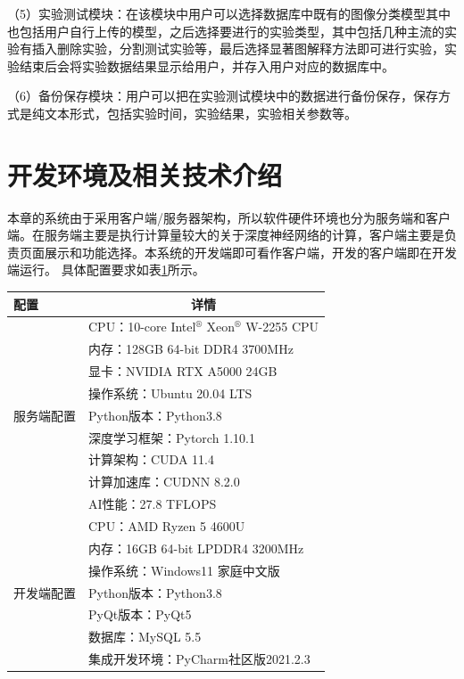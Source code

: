  （5）实验测试模块：在该模块中用户可以选择数据库中既有的图像分类模型其中也包括用户自行上传的模型，之后选择要进行的实验类型，其中包括几种主流的实验有插入删除实验，分割测试实验等，最后选择显著图解释方法即可进行实验，实验结束后会将实验数据结果显示给用户，并存入用户对应的数据库中。
 
 （6）备份保存模块：用户可以把在实验测试模块中的数据进行备份保存，保存方式是纯文本形式，包括实验时间，实验结果，实验相关参数等。


 
\section{开发环境及相关技术介绍}
本章的系统由于采用客户端/服务器架构，所以软件硬件环境也分为服务端和客户端。在服务端主要是执行计算量较大的关于深度神经网络的计算，客户端主要是负责页面展示和功能选择。本系统的开发端即可看作客户端，开发的客户端即在开发端运行。  具体配置要求如表\ref{tab:sys}所示。
\begin{table}[!ht]
	\renewcommand{\arraystretch}{1.5}
	\centering
	\label{tab:sys}
	\begin{tabular}{p{4cm}p{8cm}} 
		\hline
		配置                     & \multicolumn{1}{c}{详情}             \\ 
		\hline
		\multirow{9}{*}{服务端配置} & CPU：10-core Intel$^\circledR$ Xeon$^\circledR$ W-2255 CPU  \\
		& 内存：128GB 64-bit DDR4 3700MHz       \\
		& 显卡：NVIDIA RTX A5000 24GB           \\
		& 操作系统：Ubuntu 20.04 LTS              \\
		& Python版本：Python3.8                 \\
		& 深度学习框架：Pytorch 1.10.1              \\
		& 计算架构：CUDA 11.4                     \\
		& 计算加速库：CUDNN 8.2.0                  \\
		& AI性能：27.8 TFLOPS                   \\ 
		\hline
		\multirow{7}{*}{开发端配置} & CPU：AMD Ryzen 5 4600U              \\
		& 内存：16GB 64-bit LPDDR4 3200MHz      \\
		& 操作系统：Windows11 家庭中文版               \\
		& Python版本：Python3.8                 \\
		& PyQt版本：PyQt5                       \\
		& 数据库：MySQL 5.5                      \\
		& 集成开发环境：PyCharm社区版2021.2.3            \\
		\hline
	\end{tabular}
\end{table}




